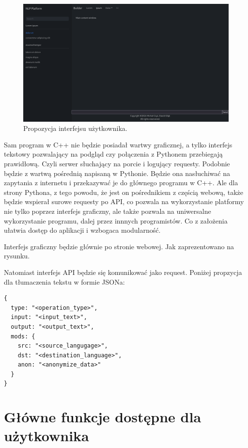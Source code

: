 \documentclass{article}
\begin{document}
\begin{figure}
\centering
  \includegraphics[width=1\linewidth]{ui_mockup.png}
  \caption{\label{fig:ui mockup}Propozycja interfejsu użytkownika.}
\end{figure}

Sam program w C++ nie będzie posiadał wartwy graficznej, a tylko interfejs tekstowy pozwalający na podgląd czy połączenia z Pythonem przebiegają prawidłową. Czyli serwer słuchający na porcie i logujący requesty. Podobnie będzie z wartwą pośrednią napisaną w Pythonie. Będzie ona nasłuchiwać na zapytania z internetu i przekazywać je do głównego programu w C++. Ale dla strony Pythona, z tego powodu, że jest on pośrednikiem z częścią webową, także będzie wspierał surowe requesty po API, co pozwala na wykorzystanie platformy nie tylko poprzez interfejs graficzny, ale także pozwala na uniwersalne wykorzystanie programu, dalej przez innnych programistów. Co z założenia ułatwia dostęp do aplikacji i wzbogaca modularność. 

Interfejs graficzny będzie głównie po stronie webowej. Jak zaprezentowano na rysunku.

Natomiast interfejs API będzie się komunikować jako request. Poniżej propzycja dla tłumaczenia tekstu w formie JSONa:

\begin{lstlisting}
{
  type: "<operation_type>",
  input: "<input_text>",
  output: "<output_text>",
  mods: {
    src: "<source_langugage>", 
    dst: "<destination_language>",
    anon: "<anonymize_data>"
  }
}
\end{lstlisting}

\section{Główne funkcje dostępne dla użytkownika}
\end{document}

